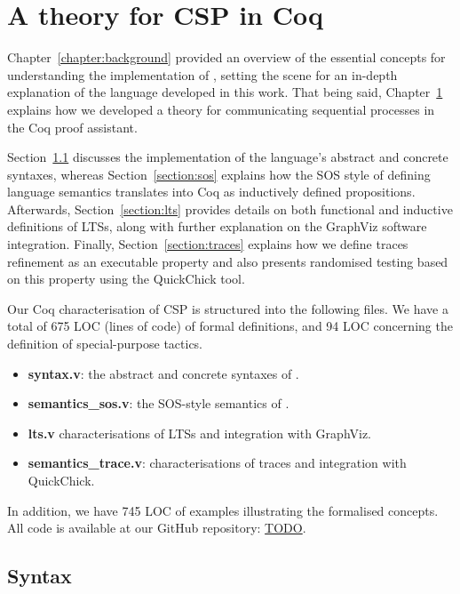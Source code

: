 \chapter{A theory for CSP in Coq}
\label{chapter:csp_coq}

Chapter~\ref{chapter:background} provided an overview of the essential concepts for understanding the implementation of \CSPcoq{}, setting the scene for an in-depth explanation of the language developed in this work. That being said, Chapter~\ref{chapter:csp_coq} explains how we developed a theory for communicating sequential processes in the Coq proof assistant.

Section~\ref{section:syntax} discusses the implementation of the language's abstract and concrete syntaxes, whereas Section~\ref{section:sos} explains how the SOS style of defining language semantics translates into Coq as inductively defined propositions. Afterwards, Section~\ref{section:lts} provides details on both functional and inductive definitions of LTSs, along with further explanation on the GraphViz software integration. Finally, Section~\ref{section:traces} explains how we define traces refinement as an executable property and also presents randomised testing based on this property using the QuickChick tool.

Our Coq characterisation of CSP is structured into the following files. We have a total of 675 LOC (lines of code) of formal definitions, and 94 LOC concerning the definition of special-purpose tactics.

\begin{itemize}
	\item \textbf{syntax.v}: the abstract and concrete syntaxes of \CSPcoq{}.
	\item \textbf{semantics\_sos.v}: the SOS-style semantics of \CSPcoq{}.
	\item \textbf{lts.v} characterisations of LTSs and integration with GraphViz.
	\item \textbf{semantics\_trace.v}: characterisations of traces and integration with QuickChick.
\end{itemize}

In addition, we have 745 LOC of examples illustrating the formalised concepts. All code is available at our GitHub repository: \url{TODO}.

\section{Syntax}
\label{section:syntax}

